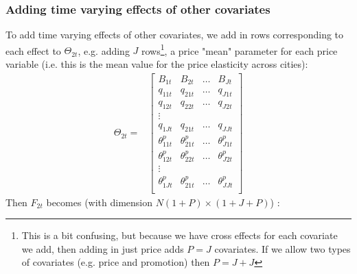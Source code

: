 \documentclass[letter,10pt]{article}
\begin{document}
\subsubsection{Adding time varying effects of other covariates}

To add time varying effects of other covariates, we add in rows corresponding to each effect to $\Theta_{2t}$, e.g. 
adding $J$ rows\footnote{\baselineskip 12pt This is a bit confusing, but because we have cross effects for each covariate we add, then 
adding in just price adds $P=J$ covariates. If we allow two types of covariates (e.g. price and promotion) then
$P=J+J$}, 
a price "mean" parameter for each price variable (i.e. this is the mean value for the price elasticity across cities): 
\begin{equation}
\begin{array}{ll}
      \Theta_{2t} = & \left[\begin{array}{cccl}
		 B_{1t} & B_{2t} &\ldots & B_{Jt} \\
		q_{11t} & q_{21t} & \ldots & q_{J1t} \\
		q_{12t} & q_{22t} & \ldots & q_{J2t} \\
	\vdots\\
		q_{1Jt} & q_{21t} & \ldots & q_{JJt} \\

		\theta^p_{11t} & \theta^p_{21t} & \ldots & \theta^p_{J1t} \\
		\theta^p_{12t} & \theta^p_{22t} & \ldots & \theta^p_{J2t} \\
	\vdots\\
		\theta^p_{1Jt} & \theta^p_{21t} & \ldots & \theta^p_{JJt} \\

		\end{array}\right]
\end{array}
\end{equation} 
Then $F_{2t}$ becomes (with dimension $N(1+P)\times (1+J+P)$) :
\end{document}
